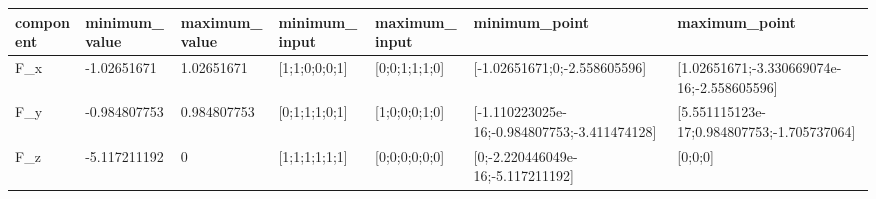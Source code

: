 \begin{tabular}{@{}lllllll@{}}
\toprule
component & minimum\_value & maximum\_value & minimum\_input & maximum\_input & minimum\_point & maximum\_point \\
\midrule
F\_x & -1.02651671 & 1.02651671 & [1;1;0;0;0;1] & [0;0;1;1;1;0] & [-1.02651671;0;-2.558605596] & [1.02651671;-3.330669074e-16;-2.558605596] \\
F\_y & -0.984807753 & 0.984807753 & [0;1;1;1;0;1] & [1;0;0;0;1;0] & [-1.110223025e-16;-0.984807753;-3.411474128] & [5.551115123e-17;0.984807753;-1.705737064] \\
F\_z & -5.117211192 & 0 & [1;1;1;1;1;1] & [0;0;0;0;0;0] & [0;-2.220446049e-16;-5.117211192] & [0;0;0] \\
\bottomrule
\end{tabular}
